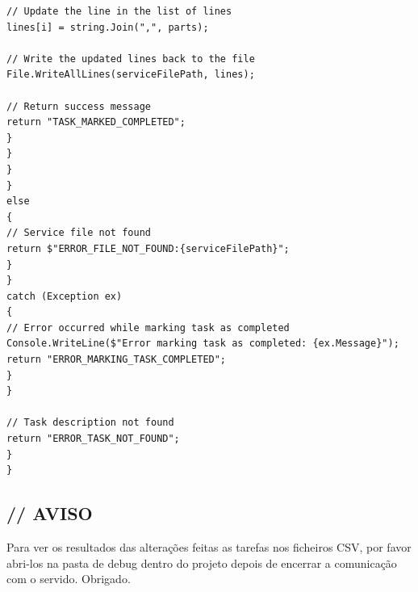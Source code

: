 \documentclass[12pt]{article}
\begin{document}
\begin{verbatim}
// Update the line in the list of lines
lines[i] = string.Join(",", parts);

// Write the updated lines back to the file
File.WriteAllLines(serviceFilePath, lines);

// Return success message
return "TASK_MARKED_COMPLETED";
}
}
}
}
else
{
// Service file not found
return $"ERROR_FILE_NOT_FOUND:{serviceFilePath}";
}
}
catch (Exception ex)
{
// Error occurred while marking task as completed
Console.WriteLine($"Error marking task as completed: {ex.Message}");
return "ERROR_MARKING_TASK_COMPLETED";
}
}

// Task description not found
return "ERROR_TASK_NOT_FOUND";
}
}
\end{verbatim}

\subsection{// AVISO}
Para ver os resultados das alterações feitas as tarefas nos ficheiros CSV, por favor abri-los na pasta de debug dentro do projeto depois de encerrar a comunicação com o servido. Obrigado.
\end{document}
